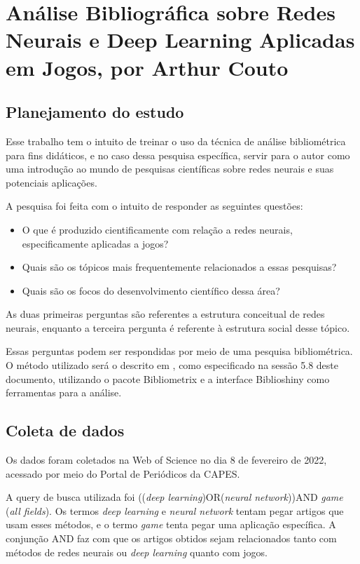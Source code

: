 \chapter{Análise Bibliográfica sobre Redes Neurais e Deep Learning Aplicadas em Jogos, por Arthur Couto\label{chap:bibliometria:CrimsonCrown}}

\section{Planejamento do estudo}
Esse trabalho tem o intuito de treinar o uso da técnica de análise bibliométrica para fins didáticos, e no caso dessa pesquisa específica, servir para o autor como uma introdução ao mundo de pesquisas científicas sobre redes neurais e suas potenciais aplicações.

A pesquisa foi feita com o intuito de responder as seguintes questões:

\begin{itemize}
    \item O que é produzido cientificamente com relação a redes neurais, especificamente aplicadas a jogos?
    \item Quais são os tópicos mais frequentemente relacionados a essas pesquisas?
    \item Quais são os focos do desenvolvimento científico dessa área?
\end{itemize}

As duas primeiras perguntas são referentes a estrutura conceitual de redes neurais, enquanto a terceira pergunta é referente à estrutura social desse tópico.

Essas perguntas podem ser respondidas por meio de uma pesquisa bibliométrica. O método utilizado será o descrito em \citet{aria_bibliometrix_2017}, como especificado na sessão 5.8 deste documento, utilizando o pacote Bibliometrix e a interface Biblioshiny como ferramentas para a análise.

\section{Coleta de dados}
Os dados foram coletados na Web of Science no dia 8 de fevereiro de 2022, acessado por meio do Portal de Periódicos da CAPES.

A query de busca utilizada foi ((\textit{deep learning})OR(\textit{neural network}))AND \textit{game} (\textit{all fields}). Os termos \textit{deep learning} e \textit{neural network} tentam pegar artigos que usam esses métodos, e o termo \textit{game} tenta pegar uma aplicação específica. A conjunção AND faz com que os artigos obtidos sejam relacionados tanto com métodos de redes neurais ou \textit{deep learning} quanto com jogos.

